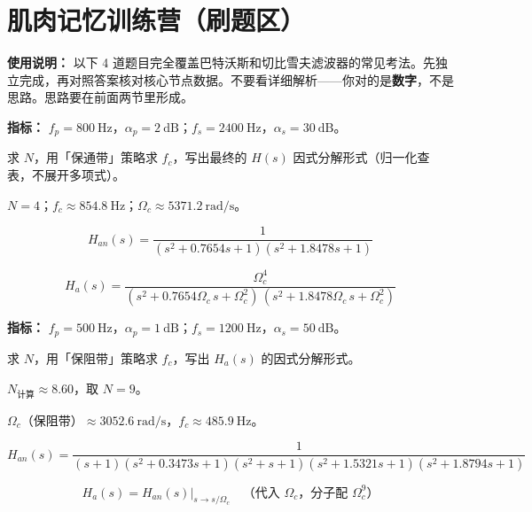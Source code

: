 \documentclass[12pt,a4paper]{ctexart}
\newcommand{\Omegac}{\Omega_c}
\newcommand{\db}{\ \mathrm{dB}}
\newcommand{\Hz}{\ \mathrm{Hz}}
\newcommand{\rads}{\ \mathrm{rad/s}}
\newcommand{\Han}{H_{\!a}(s)}
\newcommand{\HanNorm}{H_{\!an}(s)}
\begin{document}
\newpage
\section{肌肉记忆训练营（刷题区）}

\textbf{使用说明：}
以下 4 道题目完全覆盖巴特沃斯和切比雪夫滤波器的常见考法。先独立完成，再对照答案核对核心节点数据。不要看详细解析——你对的是\textbf{数字}，不是思路。思路要在前面两节里形成。

\vspace{10pt}

\begin{tcolorbox}[enhanced, colback=white, colframe=black!40,
    title={\textbf{练习 1：巴特沃斯·保通带}}, fonttitle=\bfseries, sharp corners, breakable]

\textbf{指标：} $f_p = 800\Hz$，$\alpha_p = 2\db$；$f_s = 2400\Hz$，$\alpha_s = 30\db$。

求 $N$，用「保通带」策略求 $f_c$，写出最终的 $H(s)$ 因式分解形式（归一化查表，不展开多项式）。
\end{tcolorbox}

\vspace{4pt}
\begin{answerbox}
$N = 4$；$f_c \approx 854.8\Hz$；$\Omegac \approx 5371.2\rads$。

\[
\HanNorm = \frac{1}{(s^2+0.7654s+1)(s^2+1.8478s+1)}
\]

\[
\Han = \frac{\Omegac^4}
    {(s^2 + 0.7654\Omegac\,s + \Omegac^2)\,
     (s^2 + 1.8478\Omegac\,s + \Omegac^2)}
\]
\end{answerbox}

\vspace{16pt}

\begin{tcolorbox}[enhanced, colback=white, colframe=black!40,
    title={\textbf{练习 2：巴特沃斯·保阻带}}, fonttitle=\bfseries, sharp corners, breakable]

\textbf{指标：} $f_p = 500\Hz$，$\alpha_p = 1\db$；$f_s = 1200\Hz$，$\alpha_s = 50\db$。

求 $N$，用「保阻带」策略求 $f_c$，写出 $\Han$ 的因式分解形式。
\end{tcolorbox}

\vspace{4pt}
\begin{answerbox}
$N_{\text{计算}} \approx 8.60$，取 $N = 9$。

$\Omegac$（保阻带）$\approx 3052.6\rads$，$f_c \approx 485.9\Hz$。

\[
\HanNorm = \frac{1}{(s+1)(s^2+0.3473s+1)(s^2+s+1)(s^2+1.5321s+1)(s^2+1.8794s+1)}
\]

\[
\Han = \HanNorm\big|_{s\to s/\Omegac}\quad\text{（代入 $\Omegac$，分子配 $\Omegac^9$）}
\]
\end{answerbox}
\end{document}
